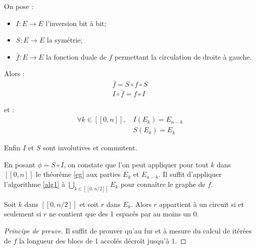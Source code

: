 \begin{csq}
On pose :

\begin{itemize}
\item $I:E\rightarrow E$ l'inversion bit \`a bit;
\item $S:E\rightarrow E$ la sym\'etrie;
\item $\bar{f}:E\rightarrow E$ la fonction duale de $f$ permettant la circulation de droite \`a gauche.
\end{itemize}

Alors :
\begin{align*}
\bar{f}=S\circ f\circ S\\ I\circ \bar{f} = f\circ I
\end{align*}

et :
\begin{align*}
\forall k\in [\![0, n]\!],\, &I(E_{k}) = E_{n-k}\\&S(E_{k}) = E_{k}
\end{align*}

Enfin $I$ et $S$ sont involutives et commutent.

En posant $\phi=S\circ I$, on constate que l'on peut appliquer pour tout $k$ dans $[\![0, n]\!]$ le th\'eor\`eme \ref{eg} aux parties $E_k$ et $E_{n-k}$. Il suffit d'appliquer l'algorithme \ref{alg1} \`a $\bigcup_{k\in [\![0, n/2]\!]}E_k$ pour conna\^itre le graphe de $f$.
\end{csq}

\begin{lem}\label{stability}
Soit $k$ dans $[\![0, n/2]\!]$ et soit $r$ dans $E_k$. Alors $r$ appartient \`a un circuit si et seulement si $r$ ne contient que des 1 espac\'es par au moins un 0.
\end{lem}
\begin{proof}[Principe de preuve]
Il suffit de prouver qu'au fur et \`a mesure du calcul de it\'er\'ees de $f$ la longueur des blocs de 1 accol\'es d\'ecro\^it jusqu'\`a $1$.
\end{proof}


